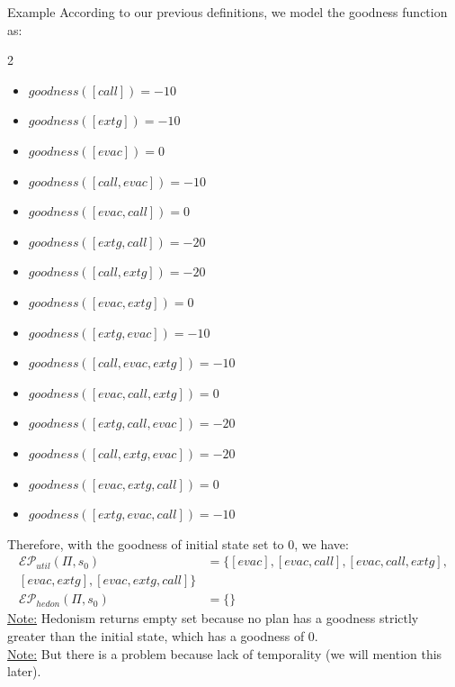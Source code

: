 \documentclass[compress,xcolor=table]{beamer}
\begin{document}
\begin{frame}{Example}
    According to our previous definitions, we model the goodness function as:
    \begin{multicols}{2}
    \tiny
    \begin{itemize}
        \item $goodness([call]) = -10$
        \item $goodness([extg]) = -10$
        \item $goodness([evac]) = 0$
        \item $goodness([call, evac]) = -10$
        \item $goodness([evac, call]) = 0$
        \item $goodness([extg, call]) = -20$
        \item $goodness([call, extg]) = -20$
        \item $goodness([evac, extg]) = 0$
        \item $goodness([extg, evac]) = -10$
        \item $goodness([call, evac, extg]) = -10$
        \item $goodness([evac, call, extg]) = 0$
        \item $goodness([extg, call, evac]) = -20$
        \item $goodness([call, extg, evac]) = -20$
        \item $goodness([evac, extg, call]) = 0$
        \item $goodness([extg, evac, call]) = -10$
    \end{itemize}
    \end{multicols}
    \pause
    Therefore, with the goodness of initial state set to 0, we have:\\
    \small
    $$
    \begin{aligned}
    \mathcal{E}\mathcal{P}_{util}(\Pi, s_0) 
    &= \{ [evac], [evac, call], [evac, call, extg],\\
     [evac, extg], [evac, extg, call] \} \\
    \mathcal{E}\mathcal{P}_{hedon}(\Pi, s_0) 
    &= \{ \} 
    \end{aligned}
    $$
\tiny
\underline{Note:} Hedonism returns empty set because no plan has a goodness strictly 
greater than the initial state, which has a goodness of 0.\\
\underline{Note:} But there is a problem because lack of temporality (we will mention this later).
\end{frame}
\end{document}
